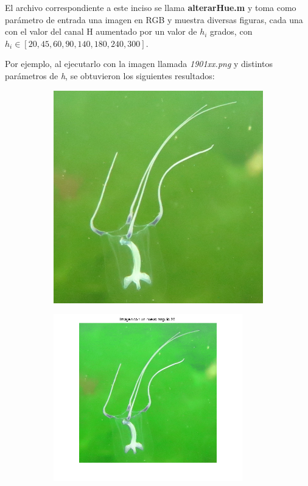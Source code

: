 \documentclass{article}
\begin{document}
El archivo correspondiente a este inciso se llama \textbf{alterarHue.m} y toma como parámetro de entrada una imagen en RGB y muestra diversas figuras, cada una con el valor del canal H aumentado por un valor de $h_{i}$ grados, con $h_{i} \in [20, 45, 60, 90, 140, 180, 240, 300]$.

Por ejemplo, al ejecutarlo con la imagen llamada \textit{1901xx.png} y distintos parámetros de \textit{h}, se obtuvieron los siguientes resultados:

\begin{figure}[H]
	\begin{subfigure}{0.5\textwidth}
	\centering
        \includegraphics[scale=0.5]{1901xx.png}
    \end{subfigure}\hfill
	\begin{subfigure}{0.5\textwidth}
	\centering
        \includegraphics[width=0.9\textwidth]{1901-h-20.png}

\end{subfigure}
\end{figure}
\end{document}
